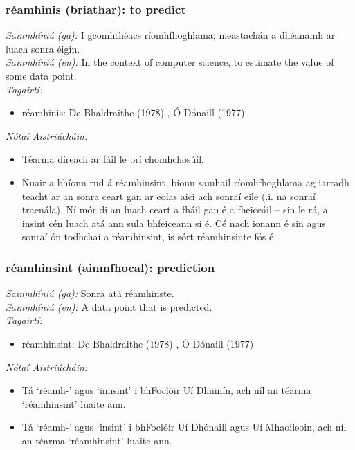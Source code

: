\documentclass{article}
\begin{document}
\subsubsection*{réamhinis (briathar): to predict}
 \noindent \textit{Sainmhíniú (ga):} I gcomhthéacs ríomhfhoghlama, meastachán a dhéanamh ar luach sonra éigin.
\\
 \noindent \textit{Sainmhíniú (en):} In the context of computer science, to estimate the value of some data point.
\\
 \noindent \textit{Tagairtí:}
\begin{itemize}
	\item réamhinis: De Bhaldraithe (1978) \cite{de-bhaldraithe}, Ó Dónaill (1977) \cite{odonaill}
\end{itemize}

 \noindent \textit{Nótaí Aistriúcháin:}
\begin{itemize}
	\item Téarma díreach ar fáil le brí chomhchosúil.
	\item Nuair a bhíonn rud á réamhinsint, bíonn samhail ríomhfhoghlama ag iarradh teacht ar an sonra ceart gan ar eolas aici ach sonraí eile (.i. na sonraí traenála). Ní mór di an luach ceart a fháil gan é a fheiceáil -- sin le rá, a insint cén luach atá ann sula bhfeiceann sí é. Cé nach ionann é sin agus sonraí ón todhchaí a réamhinsint, is sórt réamhinsinte fós é.
\end{itemize}


\subsubsection*{réamhinsint (ainmfhocal): prediction}
 \noindent \textit{Sainmhíniú (ga):} Sonra atá réamhinste.
\\
 \noindent \textit{Sainmhíniú (en):} A data point that is predicted.
\\
 \noindent \textit{Tagairtí:}
\begin{itemize}
	\item réamhinsint: De Bhaldraithe (1978) \cite{de-bhaldraithe}, Ó Dónaill (1977) \cite{odonaill}
\end{itemize}

 \noindent \textit{Nótaí Aistriúcháin:}
\begin{itemize}
	\item Tá `réamh-' agus `innsint' i bhFoclóir Uí Dhuinín, ach níl an téarma `réamhinsint' luaite ann.
	\item Tá `réamh-' agus `insint' i bhFoclóir Uí Dhónaill agus Uí Mhaoileoin, ach níl an téarma `réamhinsint' luaite ann.
\end{itemize}
\end{document}
